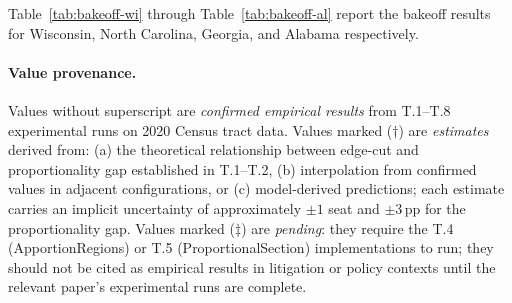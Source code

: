 Table~\ref{tab:bakeoff-wi} through Table~\ref{tab:bakeoff-al} report the
bakeoff results for Wisconsin, North Carolina, Georgia, and Alabama respectively.

\paragraph{Value provenance.}
Values without superscript are \emph{confirmed empirical results} from T.1--T.8
experimental runs on 2020 Census tract data.
Values marked \est{} ($\dagger$) are \emph{estimates} derived from:
(a) the theoretical relationship between edge-cut and proportionality gap established
in T.1--T.2, (b) interpolation from confirmed values in adjacent configurations,
or (c) model-derived predictions; each estimate carries an implicit uncertainty of
approximately $\pm 1$ seat and $\pm 3$\,pp for the proportionality gap.
Values marked \pending{} ($\ddagger$) are \emph{pending}: they require the T.4
(ApportionRegions) or T.5 (ProportionalSection) implementations to run; they should
not be cited as empirical results in litigation or policy contexts until the relevant
paper's experimental runs are complete.

